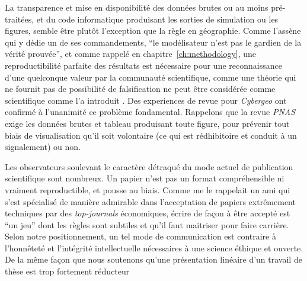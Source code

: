 La transparence et mise en disponibilité des données brutes ou au moins pré-traitées, et du code informatique produisant les sorties de simulation ou les figures, semble être plutôt l'exception que la règle en géographie. Comme l'assène  qui y dédie un de ses commandements, ``le modélisateur n'est pas le gardien de la vérité prouvée'', et comme rappelé en chapitre~\ref{ch:methodology}, une reproductibilité parfaite des résultats est nécessaire pour une reconnaissance d'une quelconque valeur par la communauté scientifique, comme une théorie qui ne fournit pas de possibilité de falsification ne peut être considérée comme scientifique comme l'a introduit . Des experiences de revue pour \emph{Cybergeo} ont confirmé à l'unanimité ce problème fondamental. Rappelons que la revue \emph{PNAS} exige les données brutes et tableau produisant toute figure, pour prévenir tout biais de visualisation qu'il soit volontaire (ce qui est rédhibitoire et conduit à un signalement) ou non.



Les observateurs soulevant le caractère détraqué du mode actuel de publication scientifique sont nombreux. Un papier n'est pas un format compréhensible ni vraiment reproductible, et pousse au biais. Comme me le rappelait un ami qui s'est spécialisé de manière admirable dans l'acceptation de papiers extrêmement techniques par des \emph{top-journals} économiques, écrire de façon à être accepté est ``un jeu'' dont les règles sont subtiles et qu'il faut maitriser pour faire carrière. Selon notre positionnement, un tel mode de communication est contraire à l'honnêteté et l'intégrité intellectuelle nécessaires à une science éthique et ouverte. De la même façon que nous soutenons qu'une présentation linéaire d'un travail de thèse est trop fortement réducteur















